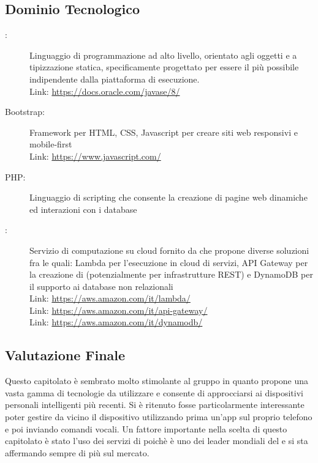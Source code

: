 \subsection{Dominio Tecnologico}
\begin{description}
\item[:] Linguaggio di programmazione ad alto livello, orientato agli oggetti e a tipizzazione statica, specificamente progettato per essere il più possibile indipendente dalla piattaforma di esecuzione.\\
Link: \href{https://docs.oracle.com/javase/8/}{https://docs.oracle.com/javase/8/}
	
	\item[Bootstrap:] Framework per HTML, CSS, Javascript per creare siti web responsivi e mobile-first\\
Link: \href{https://www.javascript.com/}{https://www.javascript.com/}

	\item[PHP:]	Linguaggio di scripting che consente la creazione di pagine web dinamiche ed interazioni con i database
	
	\item[:]	Servizio di computazione su cloud fornito da  che propone diverse soluzioni fra le quali:  Lambda per l'esecuzione in cloud di servizi,  API Gateway per la creazione di  (potenzialmente per infrastrutture REST) e  DynamoDB per il supporto ai database non relazionali\\
Link: \href{https://aws.amazon.com/it/lambda/}{https://aws.amazon.com/it/lambda/}\\
Link: \href{https://aws.amazon.com/it/api-gateway/}{https://aws.amazon.com/it/api-gateway/}\\
Link: \href{https://aws.amazon.com/it/dynamodb/}{https://aws.amazon.com/it/dynamodb/}
\end{description}

\subsection{Valutazione Finale}
Questo capitolato è sembrato molto stimolante al gruppo in quanto propone una vasta gamma di tecnologie da utilizzare e consente di approcciarsi ai dispositivi personali intelligenti più recenti. Si è ritenuto fosse particolarmente interessante poter gestire da vicino il dispositivo utilizzando prima un'app sul proprio telefono e poi inviando comandi vocali.
Un fattore importante nella scelta di questo capitolato è stato l'uso dei servizi di  poichè  è uno dei leader mondiali del  e si sta affermando sempre di più sul mercato. 
